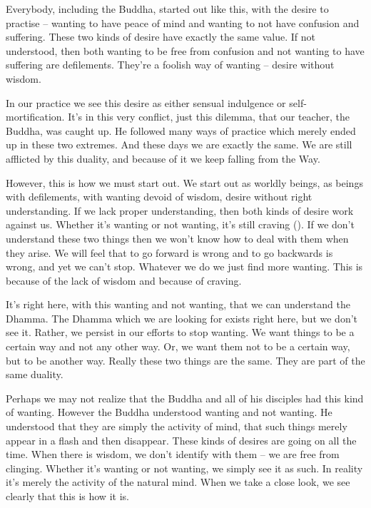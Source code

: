 Everybody, including the Buddha, started out like this, with the desire to practise -- wanting to have peace of mind and wanting to not have confusion and suffering. These two kinds of desire have exactly the same value. If not understood, then both wanting to be free from confusion and not wanting to have suffering are defilements. They're a foolish way of wanting -- desire without wisdom.

In our practice we see this desire as either sensual indulgence or self-mortification. It's in this very conflict, just this dilemma, that our teacher, the Buddha, was caught up. He followed many ways of practice which merely ended up in these two extremes. And these days we are exactly the same. We are still afflicted by this duality, and because of it we keep falling from the Way.

However, this is how we must start out. We start out as worldly beings, as beings with defilements, with wanting devoid of wisdom, desire without right understanding. If we lack proper understanding, then both kinds of desire work against us. Whether it's wanting or not wanting, it's still craving (). If we don't understand these two things then we won't know how to deal with them when they arise. We will feel that to go forward is wrong and to go backwards is wrong, and yet we can't stop. Whatever we do we just find more wanting. This is because of the lack of wisdom and because of craving.

It's right here, with this wanting and not wanting, that we can understand the Dhamma. The Dhamma which we are looking for exists right here, but we don't see it. Rather, we persist in our efforts to stop wanting. We want things to be a certain way and not any other way. Or, we want them not to be a certain way, but to be another way. Really these two things are the same. They are part of the same duality.

Perhaps we may not realize that the Buddha and all of his disciples had this kind of wanting. However the Buddha understood wanting and not wanting. He understood that they are simply the activity of mind, that such things merely appear in a flash and then disappear. These kinds of desires are going on all the time. When there is wisdom, we don't identify with them -- we are free from clinging. Whether it's wanting or not wanting, we simply see it as such. In reality it's merely the activity of the natural mind. When we take a close look, we see clearly that this is how it is.

